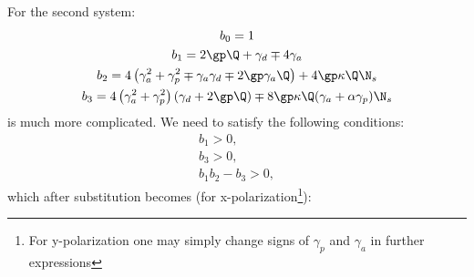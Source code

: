\documentclass[12pt, notitlepage]{report}
\begin{document}
For the second system:
\begin{gather}
	b_0 = 1\\
	b_1 = 2\gp\Q +\gamma_d \mp 4\gamma_a \\
	b_2 = 4 \left(\gamma_a^2 + \gamma_p^2 \mp \gamma_a\gamma_d \mp 2 \gp\gamma_a\Q\right)  + 4\gp\kappa\Q \N_s\\
	b_3 = 4 \left(\gamma_a^2+\gamma_p^2\right) (\gamma_d + 2 \gp\Q) \mp 8 \gp\kappa\Q (\gamma_a + \alpha  \gamma_p)\N_s
\end{gather}
is much more complicated. We need to satisfy the following conditions:
\begin{gather}
	b_1 > 0,\\
	b_3 > 0,\\
	b_1b_2 - b_3 > 0,
\end{gather}
which after substitution becomes (for x-polarization\footnote{For y-polarization one may simply change signs of $\gamma_p$ and $\gamma_a$ in further expressions}):
\end{document}
